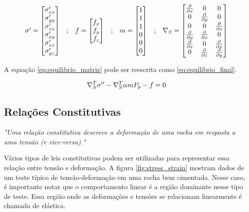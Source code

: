 \begin{equation}
\begin{matrix}
\sigma^\prime = \begin{bmatrix}
\sigma^\prime_{xx}
\\
\sigma^\prime_{yy}
\\
\sigma^\prime_{zz}
\\
\sigma^\prime_{xy}
\\
\sigma^\prime_{xz}
\\
\sigma^\prime_{yz}
\end{bmatrix}
&

;

&

f = \begin{bmatrix}
f_{x}
\\
f_{y}
\\
f_{z}
\end{bmatrix}
&
;
&

m = \begin{bmatrix} 1 \\ 1 \\ 1 \\ 0 \\ 0 \\ 0\end{bmatrix}

&
;

&
\nabla_S = \begin{bmatrix} \frac{\partial { }}{\partial x} & 0 & 0 \\ 0 & \frac{\partial { }}{\partial y} & 0 \\ 0 & 0 & \frac{\partial { }}{\partial z} \\ \frac{\partial { }}{\partial y} & \frac{\partial { }}{\partial x} & 0 \\ \frac{\partial { }}{\partial z} & 0 & \frac{\partial { }}{\partial x} \\ 0 & \frac{\partial { }}{\partial z} & \frac{\partial { }}{\partial y} \end{bmatrix}
\end{matrix}
\end{equation}

A equação \ref{eq:equilibrio_matriz} pode ser reescrita como \ref{eq:equilibrio_final}.

\begin{equation}
\label{eq:equilibrio_final}
\nabla_S^T\sigma^{\prime\prime} - \nabla_S^T\alpha m  P_p - f = 0
\end{equation}


\subsection{Relações Constitutivas}

\textit{"Uma relação constitutiva descreve a deformação de uma rocha em resposta a uma tensão (e vice-versa)."} \cite{ResGeomec}


Vários tipos de leis constitutivas podem ser utilizadas para representar essa relação entre tensão e deformação. A figura \ref{fig:stress_strain} mostram dados de um teste típico de tensão-deformação em uma rocha bem cimentada. Nesse caso, é importante notar que o comportamento linear é a região dominante nesse tipo de teste. Essa região onde as deformações e tensões se relacionam linearmente é chamada de elástica.


